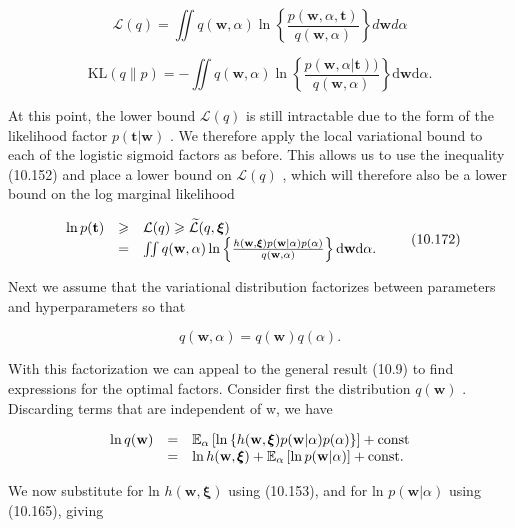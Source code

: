 \documentclass[
  10
]{article}
\begin{document}
\[
\mathcal {L} (q) = \iint q (\mathbf {w}, \alpha) \ln \left\{\frac {p (\mathbf {w} , \alpha , \mathbf {t})}{q (\mathbf {w} , \alpha)} \right\} d \mathbf {w} d \alpha\tag{10.170}
\]

\[
\mathrm{KL} (q \| p) = - \iint q (\mathbf {w}, \alpha) \ln \left\{\frac {p (\mathbf {w} , \alpha | \mathbf {t}))}{q (\mathbf {w} , \alpha)} \right\} \mathrm{d} \mathbf {w} \mathrm{d} \alpha .\tag{10.171}
\]

At this point, the lower bound \(\mathcal { L } ( q )\) is still
intractable due to the form of the likelihood factor
\(p ( \mathbf { t } | \mathbf { w } )\) . We therefore apply the local
variational bound to each of the logistic sigmoid factors as before.
This allows us to use the inequality (10.152) and place a lower bound on
\(\mathcal { L } ( q )\) , which will therefore also be a lower bound on
the log marginal likelihood

\[
\begin{array}{r c l} \ln p (\mathbf {t}) & \geqslant & \mathcal {L} (q) \geqslant \widetilde {\mathcal {L}} (q, \boldsymbol {\xi}) \\ & = & \iint q (\mathbf {w}, \alpha) \ln \left\{\frac {h (\mathbf {w} , \boldsymbol {\xi}) p (\mathbf {w} | \alpha) p (\alpha)}{q (\mathbf {w} , \alpha)} \right\} \mathrm{d} \mathbf {w}   \mathrm{d} \alpha . \end{array}\tag{10.172}
\]

Next we assume that the variational distribution factorizes between
parameters and hyperparameters so that

\[
q (\mathbf {w}, \alpha) = q (\mathbf {w}) q (\alpha).\tag{10.173}
\]

With this factorization we can appeal to the general result (10.9) to
find expressions for the optimal factors. Consider first the
distribution \(q ( \mathbf { w } )\) . Discarding terms that are
independent of w, we have

\[
\begin{array}{r c l} \ln q (\mathbf {w}) & = & \mathbb {E} _ {\alpha} \left[ \ln \left\{h (\mathbf {w}, \pmb {\xi}) p (\mathbf {w} | \alpha) p (\alpha) \right\} \right] + \mathrm{const} \\ & = & \ln h (\mathbf {w}, \pmb {\xi}) + \mathbb {E} _ {\alpha} \left[ \ln p (\mathbf {w} | \alpha) \right] + \mathrm{const}. \end{array}
\]

We now substitute for ln \(h ( \mathbf { w } , \pmb { \xi } )\) using
(10.153), and for ln \(p ( \mathbf { w } | \alpha )\) using (10.165),
giving
\end{document}
